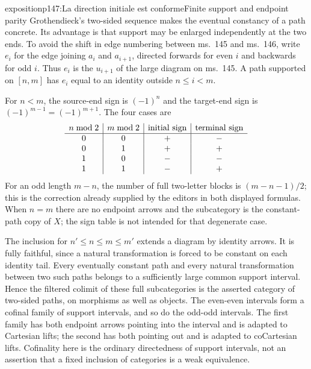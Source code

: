 \begin{dcomment}{exposition}{p147:La direction initiale est conforme}{Finite support and endpoint parity}
Grothendieck's two-sided sequence makes the eventual constancy of a path concrete. Its advantage is that support may be enlarged independently at the two ends. To avoid the shift in edge numbering between ms.~145 and ms.~146, write $e_i$ for the edge joining $a_i$ and $a_{i+1}$, directed forwards for even $i$ and backwards for odd $i$. Thus $e_i$ is the $u_{i+1}$ of the large diagram on ms.~145. A path supported on $[n,m]$ has $e_i$ equal to an identity outside $n\leq i<m$.

For $n<m$, the source-end sign is $(-1)^n$ and the target-end sign is $(-1)^{m-1}=(-1)^{m+1}$. The four cases are
\[
\begin{array}{c|c|c|c}
 n\bmod2&m\bmod2&\hbox{initial sign}&\hbox{terminal sign}\\ \hline
 0&0&+&-\\
 0&1&+&+\\
 1&0&-&-\\
 1&1&-&+
\end{array}
\]
For an odd length $m-n$, the number of full two-letter blocks is $(m-n-1)/2$; this is the correction already supplied by the editors in both displayed formulas. When $n=m$ there are no endpoint arrows and the subcategory is the constant-path copy of $X$; the sign table is not intended for that degenerate case.

The inclusion for $n'\leq n\leq m\leq m'$ extends a diagram by identity arrows. It is fully faithful, since a natural transformation is forced to be constant on each identity tail. Every eventually constant path and every natural transformation between two such paths belongs to a sufficiently large common support interval. Hence the filtered colimit of these full subcategories is the asserted category of two-sided paths, on morphisms as well as objects. The even-even intervals form a cofinal family of support intervals, and so do the odd-odd intervals. The first family has both endpoint arrows pointing into the interval and is adapted to Cartesian lifts; the second has both pointing out and is adapted to coCartesian lifts. Cofinality here is the ordinary directedness of support intervals, not an assertion that a fixed inclusion of categories is a weak equivalence.
\end{dcomment}

